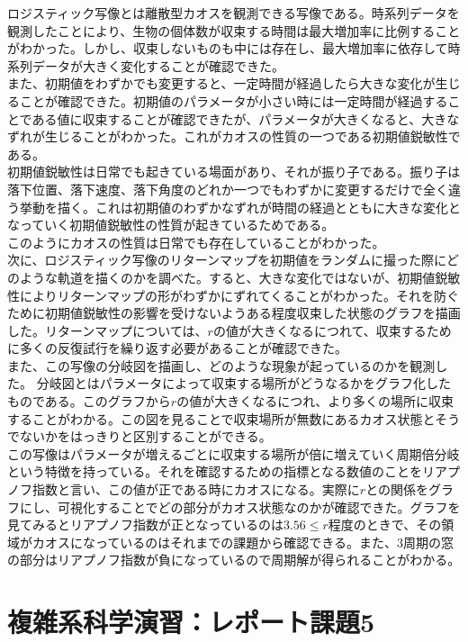 \documentclass[dvipdfmx,uplatex]{jsarticle}
\begin{document}
ロジスティック写像とは離散型カオスを観測できる写像である。時系列データを観測したことにより、生物の個体数が収束する時間は最大増加率に比例することがわかった。しかし、収束しないものも中には存在し、最大増加率に依存して時系列データが大きく変化することが確認できた。\\
また、初期値をわずかでも変更すると、一定時間が経過したら大きな変化が生じることが確認できた。初期値のパラメータが小さい時には一定時間が経過することである値に収束することが確認できたが、パラメータが大きくなると、大きなずれが生じることがわかった。これがカオスの性質の一つである初期値鋭敏性である。\\
初期値鋭敏性は日常でも起きている場面があり、それが振り子である。振り子は落下位置、落下速度、落下角度のどれか一つでもわずかに変更するだけで全く違う挙動を描く。これは初期値のわずかなずれが時間の経過とともに大きな変化となっていく初期値鋭敏性の性質が起きているためである。\\
このようにカオスの性質は日常でも存在していることがわかった。\\
次に、ロジスティック写像のリターンマップを初期値をランダムに撮った際にどのような軌道を描くのかを調べた。すると、大きな変化ではないが、初期値鋭敏性によりリターンマップの形がわずかにずれてくることがわかった。それを防ぐために初期値鋭敏性の影響を受けないようある程度収束した状態のグラフを描画した。リターンマップについては、$r$の値が大きくなるにつれて、収束するために多くの反復試行を繰り返す必要があることが確認できた。\\
また、この写像の分岐図を描画し、どのような現象が起っているのかを観測した。 分岐図とはパラメータによって収束する場所がどうなるかをグラフ化したものである。このグラフから$r$の値が大きくなるにつれ、より多くの場所に収束することがわかる。この図を見ることで収束場所が無数にあるカオス状態とそうでないかをはっきりと区別することができる。\\
この写像はパラメータが増えるごとに収束する場所が倍に増えていく周期倍分岐という特徴を持っている。それを確認するための指標となる数値のことをリアプノフ指数と言い、この値が正である時にカオスになる。実際に$r$との関係をグラフにし、可視化することでどの部分がカオス状態なのかが確認できた。グラフを見てみるとリアプノフ指数が正となっているのは$3.56≤r$程度のときで、その領域がカオスになっているのはそれまでの課題から確認できる。また、3周期の窓の部分はリアプノフ指数が負になっているので周期解が得られることがわかる。

\newpage

\section{複雑系科学演習：レポート課題5}
\end{document}
